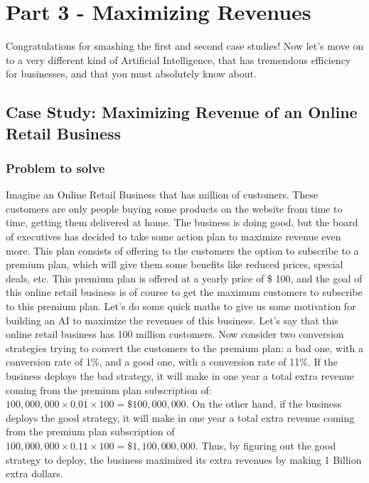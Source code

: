 \documentclass[]{book}
\begin{document}
\hypertarget{part-3---maximizing-revenues}{%
\chapter{Part 3 - Maximizing Revenues}\label{part-3---maximizing-revenues}}

Congratulations for smashing the first and second case studies! Now let's move on to a very different kind of Artificial Intelligence, that has tremendous efficiency for businesses, and that you must absolutely know about.

\hypertarget{case-study-maximizing-revenue-of-an-online-retail-business}{%
\section{Case Study: Maximizing Revenue of an Online Retail Business}\label{case-study-maximizing-revenue-of-an-online-retail-business}}

\hypertarget{problem-to-solve-2}{%
\subsection{Problem to solve}\label{problem-to-solve-2}}

Imagine an Online Retail Business that has million of customers. These customers are only people buying some products on the website from time to time, getting them delivered at home. The business is doing good, but the board of executives has decided to take some action plan to maximize revenue even more. This plan consists of offering to the customers the option to subscribe to a premium plan, which will give them some benefits like reduced prices, special deals, etc. This premium plan is offered at a yearly price of \$ 100, and the goal of this online retail business is of course to get the maximum customers to subscribe to this premium plan. Let's do some quick maths to give us some motivation for building an AI to maximize the revenues of this business. Let's say that this online retail business has 100 million customers. Now consider two conversion strategies trying to convert the customers to the premium plan: a bad one, with a conversion rate of 1\%, and a good one, with a conversion rate of 11\%. If the business deploys the bad strategy, it will make in one year a total extra revenue coming from the premium plan subscription of: \(100,000,000 \times 0.01 \times 100 = \$ 100,000,000\). On the other hand, if the business deploys the good strategy, it will make in one year a total extra revenue coming from the premium plan subscription of \(100,000,000 \times 0.11 \times 100 = \$ 1,100,000,000\). Thus, by figuring out the good strategy to deploy, the business maximized its extra revenues by making 1 Billion extra dollars.
\end{document}
